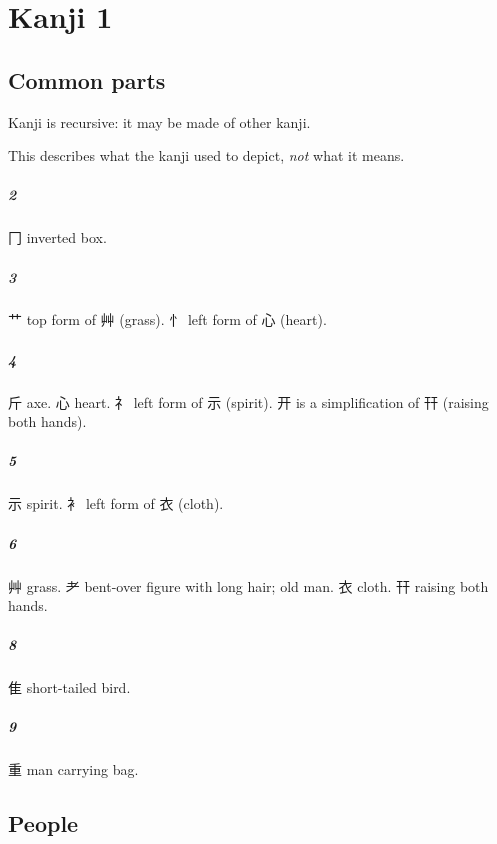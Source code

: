 \chapter{Kanji 1}

\section{Common parts}

Kanji is recursive: it may be made of other kanji.

This describes what the kanji used to depict, \emph{not} what it means.

\paragraph{2}
冂 inverted box.

\paragraph{3}
艹 top form of 艸 (grass).
忄 left form of 心 (heart).

\paragraph{4}
斤 axe.
心 heart.
礻 left form of ⽰ (spirit).
开 is a simplification of 幵 (raising both hands).

\paragraph{5}
⽰ spirit.
衤 left form of 衣 (cloth).

\paragraph{6}
艸 grass.
耂 bent-over figure with long hair; old man.
衣 cloth.
幵 raising both hands.

\paragraph{8}
隹 short-tailed bird.

\paragraph{9}
重 man carrying bag.

\section{People}

